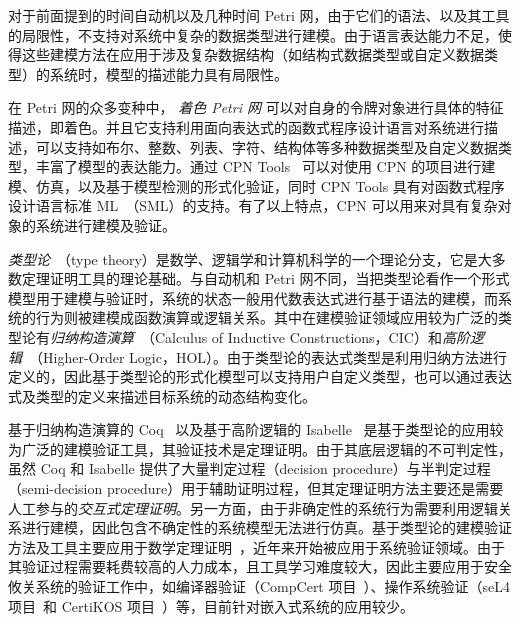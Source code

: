 对于前面提到的时间自动机以及几种时间 Petri 网，由于它们的语法、以及其工具的局限性，不支持对系统中复杂的数据类型进行建模。由于语言表达能力不足，使得这些建模方法在应用于涉及复杂数据结构（如结构式数据类型或自定义数据类型）的系统时，模型的描述能力具有局限性。

在 Petri 网的众多变种中，
\emph{着色 Petri 网} 可以对自身的令牌对象进行具体的特征描述，即着色。并且它支持利用面向表达式的函数式程序设计语言对系统进行描述，可以支持如布尔、整数、列表、字符、结构体等多种数据类型及自定义数据类型，丰富了模型的表达能力。通过 CPN Tools~\cite{DBLP:journals/sttt/JensenKW07} 可以对使用 CPN 的项目进行建模、仿真，以及基于模型检测的形式化验证，同时 CPN Tools 具有对函数式程序设计语言标准 ML~\cite{DBLP:conf/tphol/Syme93}（SML）的支持。有了以上特点，CPN 可以用来对具有复杂对象的系统进行建模及验证。

\emph{类型论}~\cite{DBLP:books/daglib/0070479}（type theory）是数学、逻辑学和计算机科学的一个理论分支，它是大多数定理证明工具的理论基础。与自动机和 Petri 网不同，当把类型论看作一个形式模型用于建模与验证时，系统的状态一般用代数表达式进行基于语法的建模，而系统的行为则被建模成函数演算或逻辑关系。其中在建模验证领域应用较为广泛的类型论有\emph{归纳构造演算}~\cite{DBLP:conf/mpc/Parent95}（Calculus of Inductive Constructions，CIC）和\emph{高阶逻辑}~\cite{van1983higher}（Higher-Order Logic，HOL）。由于类型论的表达式类型是利用归纳方法进行定义的，因此基于类型论的形式化模型可以支持用户自定义类型，也可以通过表达式及类型的定义来描述目标系统的动态结构变化。

基于归纳构造演算的 Coq~\cite{DBLP:series/txtcs/BertotC04} 以及基于高阶逻辑的 Isabelle~\cite{DBLP:books/sp/NipkowPW02} 是基于类型论的应用较为广泛的建模验证工具，其验证技术是定理证明。由于其底层逻辑的不可判定性，虽然 Coq 和 Isabelle 提供了大量判定过程（decision procedure）与半判定过程（semi-decision procedure）用于辅助证明过程，但其定理证明方法主要还是需要人工参与的\emph{交互式定理证明}。另一方面，由于非确定性的系统行为需要利用逻辑关系进行建模，因此包含不确定性的系统模型无法进行仿真。基于类型论的建模验证方法及工具主要应用于数学定理证明~\cite{DBLP:conf/ascm/Gonthier07,DBLP:journals/jar/Paulson15}，近年来开始被应用于系统验证领域。由于其验证过程需要耗费较高的人力成本，且工具学习难度较大，因此主要应用于安全攸关系统的验证工作中，如编译器验证（CompCert 项目~\cite{DBLP:journals/cacm/Leroy09,DBLP:conf/popl/StewartBCA15}）、操作系统验证（seL4 项目~\cite{DBLP:conf/sosp/KleinEHACDEEKNSTW09}和 CertiKOS 项目~\cite{DBLP:conf/apsys/GuVFSC11,DBLP:conf/osdi/GuSCWKSC16}）等，目前针对嵌入式系统的应用较少。

